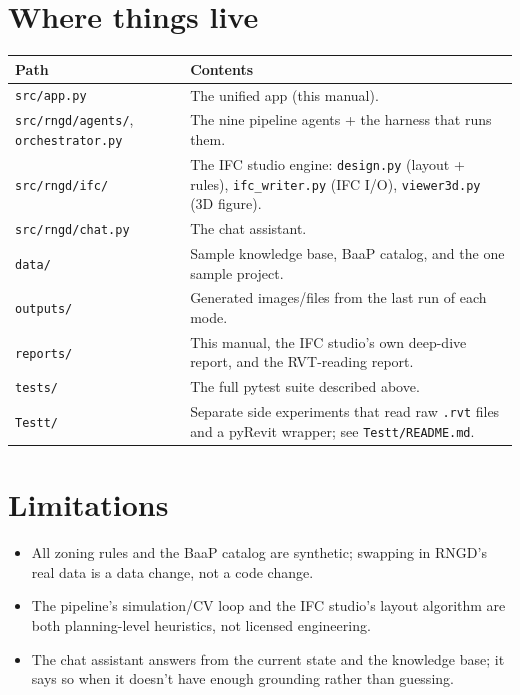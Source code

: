 \documentclass[11pt]{article}
\begin{document}
\section{Where things live}
\begin{table}[H]\centering\small
\begin{tabular}{@{}lp{9cm}@{}}\toprule
Path & Contents \\ \midrule
\texttt{src/app.py} & The unified app (this manual). \\
\texttt{src/rngd/agents/}, \texttt{orchestrator.py} & The nine pipeline agents + the harness that runs them. \\
\texttt{src/rngd/ifc/} & The IFC studio engine: \texttt{design.py} (layout + rules), \texttt{ifc\_writer.py} (IFC I/O), \texttt{viewer3d.py} (3D figure). \\
\texttt{src/rngd/chat.py} & The chat assistant. \\
\texttt{data/} & Sample knowledge base, BaaP catalog, and the one sample project. \\
\texttt{outputs/} & Generated images/files from the last run of each mode. \\
\texttt{reports/} & This manual, the IFC studio's own deep-dive report, and the RVT-reading report. \\
\texttt{tests/} & The full pytest suite described above. \\
\texttt{Testt/} & Separate side experiments that read raw \texttt{.rvt} files and a pyRevit wrapper; see \texttt{Testt/README.md}. \\ \bottomrule
\end{tabular}\end{table}

\section{Limitations}
\begin{itemize}[nosep]
\item All zoning rules and the BaaP catalog are synthetic; swapping in RNGD's real data is a data change, not a code change.
\item The pipeline's simulation/CV loop and the IFC studio's layout algorithm are both planning-level heuristics, not licensed engineering.
\item The chat assistant answers from the current state and the knowledge base; it says so when it doesn't have enough grounding rather than guessing.
\end{itemize}
\end{document}
